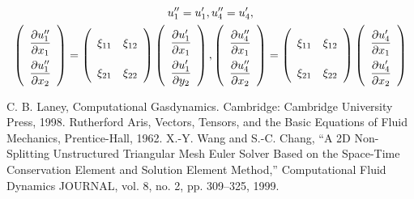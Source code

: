 \documentclass[a4paper,12pt,dvips]{article}
\begin{document}
\begin{gather*}
  u''_1 = u'_1, u''_4 = u'_4,
  \\
  \renewcommand{\arraystretch}{2.2}
  \left(\begin{array}{c}
    \dfrac{\partial u''_1}{\partial x_1} \\
    \dfrac{\partial u''_1}{\partial x_2}
  \end{array}\right)
  = \left(\begin{array}{ccc}
    \xi_{11} & \xi_{12} \\
    \xi_{21} & \xi_{22}
  \end{array}\right)
  \left(\begin{array}{c}
    \dfrac{\partial u'_1}{\partial x_1} \\
    \dfrac{\partial u'_1}{\partial y_2}
  \end{array}\right),
  \left(\begin{array}{c}
    \dfrac{\partial u''_4}{\partial x_1} \\
    \dfrac{\partial u''_4}{\partial x_2}
  \end{array}\right)
  = \left(\begin{array}{ccc}
    \xi_{11} & \xi_{12} \\
    \xi_{21} & \xi_{22}
  \end{array}\right)
  \left(\begin{array}{c}
    \dfrac{\partial u'_4}{\partial x_1} \\
    \dfrac{\partial u'_4}{\partial x_2}
  \end{array}\right)
\end{gather*}

\begin{thebibliography}{99}
 C. B. Laney, Computational Gasdynamics.
Cambridge: Cambridge University Press, 1998.
 Rutherford Aris, Vectors, Tensors, and the Basic
Equations of Fluid Mechanics, Prentice-Hall, 1962.
 X.-Y. Wang and S.-C. Chang, ``A 2D Non-Splitting
Unstructured Triangular Mesh Euler Solver Based on the Space-Time Conservation
Element and Solution Element Method,'' Computational Fluid Dynamics JOURNAL,
vol. 8, no. 2, pp. 309–325, 1999.
\end{thebibliography}
\end{document}
